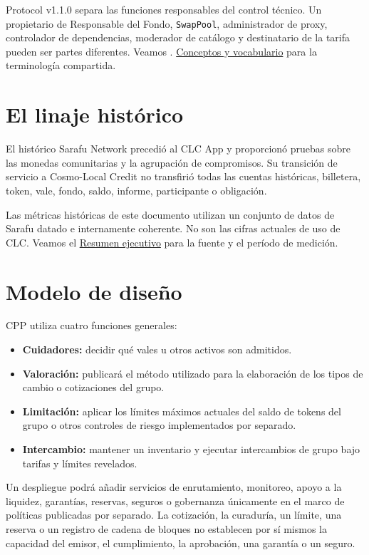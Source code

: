 \documentclass[11pt]{article}
\begin{document}
Protocol v1.1.0 separa las funciones responsables del control técnico. Un propietario de Responsable del Fondo, \texttt{SwapPool}, administrador de proxy, controlador de dependencias, moderador de catálogo y destinatario de la tarifa pueden ser partes diferentes. Veamos . \href{https://docs.cosmolocal.credit/es/introduction/concepts}{Conceptos y vocabulario} para la terminología compartida.

\section*{El linaje histórico}

El histórico Sarafu Network precedió al CLC App y proporcionó pruebas sobre las monedas comunitarias y la agrupación de compromisos. Su transición de servicio a Cosmo-Local Credit no transfirió todas las cuentas históricas, billetera, token, vale, fondo, saldo, informe, participante o obligación.

Las métricas históricas de este documento utilizan un conjunto de datos de Sarafu datado e internamente coherente. No son las cifras actuales de uso de CLC. Veamos el \href{https://docs.cosmolocal.credit/es/white-paper/executive-summary}{Resumen ejecutivo} para la fuente y el período de medición.

\section*{Modelo de diseño}

CPP utiliza cuatro funciones generales:

\begin{itemize}[leftmargin=*]
\item \textbf{Cuidadores:} decidir qué vales u otros activos son admitidos.
\item \textbf{Valoración:} publicará el método utilizado para la elaboración de los tipos de cambio o cotizaciones del grupo.
\item \textbf{Limitación:} aplicar los límites máximos actuales del saldo de tokens del grupo o otros controles de riesgo implementados por separado.
\item \textbf{Intercambio:} mantener un inventario y ejecutar intercambios de grupo bajo tarifas y límites revelados.
\end{itemize}
Un despliegue podrá añadir servicios de enrutamiento, monitoreo, apoyo a la liquidez, garantías, reservas, seguros o gobernanza únicamente en el marco de políticas publicadas por separado. La cotización, la curaduría, un límite, una reserva o un registro de cadena de bloques no establecen por sí mismos la capacidad del emisor, el cumplimiento, la aprobación, una garantía o un seguro.
\end{document}
